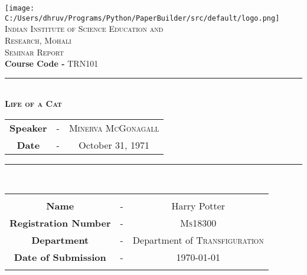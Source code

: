 \documentclass[a4paper,12pt]{article}
\begin{document}
\begin{titlepage}
\newcommand{\HRule}{\rule{\linewidth}{0.5mm}} %
\center %


\texttt{[image: C:/Users/dhruv/Programs/Python/PaperBuilder/src/default/logo.png]}\\[1cm] 

\textsc{\LARGE Indian Institute of Science Education and \\[5mm]Research, Mohali}\\[1.5cm]
\textsc{\Large Seminar Report}\\[0.5cm]
\large\textbf{Course Code -} \textsc{TRN101}\\[0.5cm]
\HRule \\[0.6cm]
{\Large\textbf{\textsc{Life of a Cat}}}\\[0.4cm]

\begin{tabular}{c c c}
  \large{\bfseries Speaker} & - &%
  \large{\textsc{Minerva McGonagall}}\\
  
  \large{\bfseries Date} & - &%
  \large{October 31, 1971}
  \\[7mm]
\end{tabular}
\HRule \\[1.5cm]

\begin{tabular}{|c c c|}
    \hline
    & &\\   
    \large{\textbf{Name }} & - &%
    \large{Harry Potter}\\ %
    
    
    \large{\textbf{Registration Number}} & - &%
    \large{\textsc{Ms18300}}\\ %
    
    
        \large{\textbf{Department}} & - &%
    \large{Department of \textsc{Transfiguration}} \\ %
        
    \large{\textbf{Date of Submission}} & - &%
    \large{\today}\\
    & &\\
    \hline
\end{tabular}

\vfill %

\end{titlepage}
\end{document}
